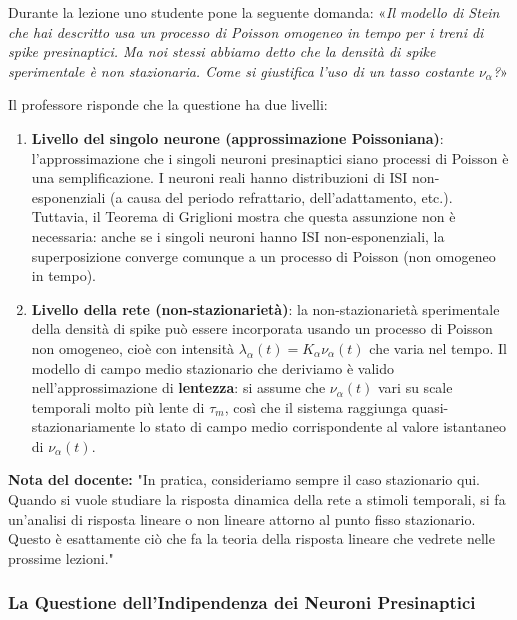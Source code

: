 Durante la lezione uno studente pone la seguente domanda: «\textit{Il modello di Stein che hai descritto usa un processo di Poisson omogeneo in tempo per i treni di spike presinaptici. Ma noi stessi abbiamo detto che la densità di spike sperimentale è non stazionaria. Come si giustifica l'uso di un tasso costante $\nu_\alpha$?}»

Il professore risponde che la questione ha due livelli:

\begin{enumerate}
    \item \textbf{Livello del singolo neurone (approssimazione Poissoniana)}: l'approssimazione che i singoli neuroni presinaptici siano processi di Poisson è una semplificazione. I neuroni reali hanno distribuzioni di ISI non-esponenziali (a causa del periodo refrattario, dell'adattamento, etc.). Tuttavia, il Teorema di Griglioni mostra che questa assunzione non è necessaria: anche se i singoli neuroni hanno ISI non-esponenziali, la superposizione converge comunque a un processo di Poisson (non omogeneo in tempo).
    \item \textbf{Livello della rete (non-stazionarietà)}: la non-stazionarietà sperimentale della densità di spike può essere incorporata usando un processo di Poisson non omogeneo, cioè con intensità $\lambda_\alpha(t) = K_\alpha \nu_\alpha(t)$ che varia nel tempo. Il modello di campo medio stazionario che deriviamo è valido nell'approssimazione di \textbf{lentezza}: si assume che $\nu_\alpha(t)$ vari su scale temporali molto più lente di $\tau_m$, così che il sistema raggiunga quasi-stazionariamente lo stato di campo medio corrispondente al valore istantaneo di $\nu_\alpha(t)$.
\end{enumerate}

\begin{tcolorbox}[colback=gray!5, colframe=gray!40, arc=2mm, boxrule=0.5pt]
\textbf{Nota del docente:} "In pratica, consideriamo sempre il caso stazionario qui. Quando si vuole studiare la risposta dinamica della rete a stimoli temporali, si fa un'analisi di risposta lineare o non lineare attorno al punto fisso stazionario. Questo è esattamente ciò che fa la teoria della risposta lineare che vedrete nelle prossime lezioni."
\end{tcolorbox}

\subsubsection{La Questione dell'Indipendenza dei Neuroni Presinaptici}

